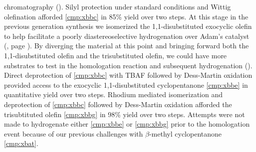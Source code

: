 chromatography (). Silyl protection under standard conditions and
Wittig olefination afforded \ref{cmp:xbbc} in 85\% yield over two steps. At this stage in the
previous generation synthesis we isomerized the 1,1-disubstituted exocyclic olefin to help
facilitate a poorly diastereoselective hydrogenation over Adam's catalyst (, page
\pageref{sch:forwardgenone}). By diverging the material at this point and
bringing forward both the 1,1-disubstituted olefin and the trisubstituted olefin, we could have
more substrates to test in the homologation reaction and subsequent hydrogenation
().
Direct deprotection of \ref{cmp:xbbc} with TBAF followed by Dess-Martin oxidation provided access to
the exocyclic 1,1-disubstituted cyclopentanone \ref{cmp:xbbe} in quantitative yield over two steps.
Rhodium mediated isomerization and deprotection of \ref{cmp:xbbc} followed by Dess-Martin oxidation
afforded the trisubtituted olefin \ref{cmp:xbbg} in 98\% yield over two steps. Attempts were not
made to hydrogenate either \ref{cmp:xbbe} or \ref{cmp:xbbg} prior to the homologation event because
of our previous challenges with $\beta$-methyl cyclopentanone \ref{cmp:xbat}.

